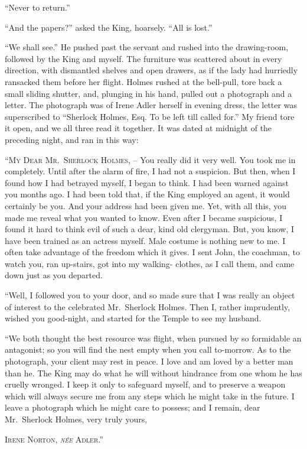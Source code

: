 “Never to return.”

“And the papers?” asked the King, hoarsely. “All is lost.”

“We shall see.” He pushed past the servant and rushed
into the drawing-room, followed by the King and myself. The
furniture was scattered about in every direction, with dismantled
shelves and open drawers, as if the lady had hurriedly
ransacked them before her flight. Holmes rushed at the
bell-pull, tore back a small sliding shutter, and, plunging in his
hand, pulled out a photograph and a letter. The photograph
was of Irene Adler herself in evening dress, the letter was
superscribed to “Sherlock Holmes, Esq. To be left till called
for.” My friend tore it open, and we all three read it together.
It was dated at midnight of the preceding night, and ran
in this way:

\begin{letter}
“\textsc{My Dear Mr.~Sherlock Holmes}, -- You really did it
very well. You took me in completely. Until after the alarm
of fire, I had not a suspicion. But then, when I found how I
had betrayed myself, I began to think. I had been warned
against you months ago. I had been told that, if the King
employed an agent, it would certainly be you. And your address
had been given me. Yet, with all this, you made me reveal
what you wanted to know. Even after I became suspicious,
I found it hard to think evil of such a dear, kind old
clergyman. But, you know, I have been trained as an actress
myself. Male costume is nothing new to me. I often take
advantage of the freedom which it gives. I sent John, the
coachman, to watch you, ran up-stairs, got into my walking-%
clothes, as I call them, and came down just as you departed.

“Well, I followed you to your door, and so made sure that
I was really an object of interest to the celebrated Mr.~Sherlock
Holmes. Then I, rather imprudently, wished you good-night,
and started for the Temple to see my husband.

“We both thought the best resource was flight, when pursued
by so formidable an antagonist; so you will find the
nest empty when you call to-morrow. As to the photograph,
your client may rest in peace. I love and am loved by a better
man than he. The King may do what he will without
hindrance from one whom he has cruelly wronged. I keep
it only to safeguard myself, and to preserve a weapon which
will always secure me from any steps which he might take in
the future. I leave a photograph which he might care to
possess; and I remain, dear Mr.~Sherlock Holmes, very truly
yours,

\hfill\textsc{Irene Norton, \textit{née} Adler}.”
\end{letter}

